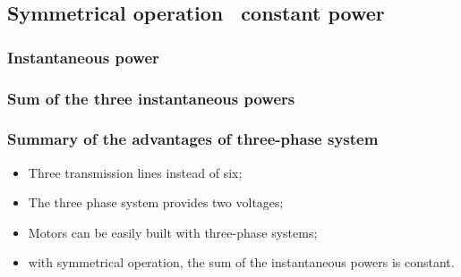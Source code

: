\documentclass{article}
\begin{document}

\newpage
\subsection{Symmetrical operation \textrightarrow\ constant power}
\subsubsection{Instantaneous power}

\subsubsection{Sum of the three instantaneous powers}










\newpage
\subsubsection{Summary of the advantages of three-phase system}
\begin{itemize}
    \item Three transmission lines instead of six;
    \item The three phase system provides two voltages;
    \item Motors can be easily built with three-phase systems;
    \item with symmetrical operation, the sum of the instantaneous powers is constant.
\end{itemize}
\end{document}
